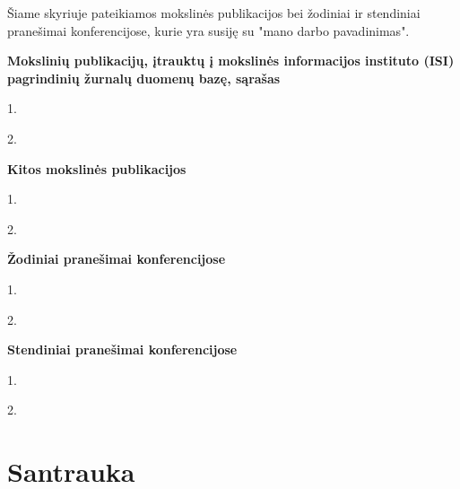 \documentclass[a4paper, 12pt]{article} %
\begin{document}
\begin{onehalfspacing}

\v{S}iame skyriuje pateikiamos mokslin\.{e}s publikacijos bei \v{z}odiniai ir stendiniai prane\v{s}imai konferencijose, kurie yra susij\k{e} su "mano darbo pavadinimas".\\

\begin{center}
\textbf{Mokslini\k{u} publikacij\k{u}, \k{i}traukt\k{u} \k{i} mokslin\.{e}s informacijos instituto (ISI) pagrindini\k{u} \v{z}urnal\k{u} duomen\k{u} baz\k{e}, s\k{a}rašas\\}
\end{center}

1. 

2. 

\newpage

\begin{center}
\textbf{Kitos mokslin\.{e}s publikacijos\\}
\end{center}

1. 

2. 

\begin{center}
\textbf{\v{Z}odiniai prane\v{s}imai konferencijose}\\
\end{center}

1. 

2. 

\begin{center}
\textbf{Stendiniai prane\v{s}imai konferencijose}\\
\end{center}

1. 

2. 


\end{onehalfspacing}

\newpage



\newpage

\section*{Santrauka}
\end{document}
